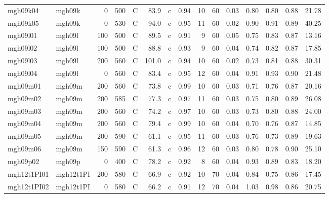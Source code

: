 \documentclass{article}
\begin{document}
\begin{landscape}
\begin{longtable}{llrrlrlrrrrrrrr}
    mgh09k04 &     mgh09k &    0 &  500 &     C &    83.9 &   c &  0.94 &  10 &         60 &  0.03 &  0.80 &  0.80 &  0.88 &   21.78 \\
    mgh09k05 &     mgh09k &    0 &  530 &     C &    94.0 &   c &  0.95 &  11 &         60 &  0.02 &  0.90 &  0.91 &  0.89 &   40.25 \\
    mgh09l01 &     mgh09l &  100 &  500 &     C &    89.5 &   c &  0.91 &   9 &         60 &  0.05 &  0.75 &  0.83 &  0.87 &   13.16 \\
    mgh09l02 &     mgh09l &  100 &  500 &     C &    88.8 &   c &  0.93 &   9 &         60 &  0.04 &  0.74 &  0.82 &  0.87 &   17.85 \\
    mgh09l03 &     mgh09l &  200 &  560 &     C &   101.0 &   c &  0.94 &  10 &         60 &  0.02 &  0.73 &  0.81 &  0.88 &   30.31 \\
    mgh09l04 &     mgh09l &    0 &  560 &     C &    83.4 &   c &  0.95 &  12 &         60 &  0.04 &  0.91 &  0.93 &  0.90 &   21.48 \\
    mgh09m01 &     mgh09m &  200 &  560 &     C &    73.8 &   c &  0.99 &  10 &         60 &  0.03 &  0.71 &  0.76 &  0.87 &   20.16 \\
    mgh09m02 &     mgh09m &  200 &  585 &     C &    77.3 &   c &  0.97 &  11 &         60 &  0.03 &  0.75 &  0.80 &  0.89 &   26.08 \\
    mgh09m03 &     mgh09m &  200 &  560 &     C &    74.2 &   c &  0.97 &  10 &         60 &  0.03 &  0.73 &  0.80 &  0.88 &   24.00 \\
    mgh09m04 &     mgh09m &  200 &  560 &     C &    79.4 &   c &  0.99 &  10 &         60 &  0.04 &  0.70 &  0.76 &  0.87 &   14.85 \\
    mgh09m05 &     mgh09m &  200 &  590 &     C &    61.1 &   c &  0.95 &  11 &         60 &  0.03 &  0.76 &  0.73 &  0.89 &   19.63 \\
    mgh09m06 &     mgh09m &  150 &  590 &     C &    61.3 &   c &  0.96 &  12 &         60 &  0.03 &  0.80 &  0.78 &  0.90 &   25.10 \\
    mgh09p02 &     mgh09p &    0 &  400 &     C &    78.2 &   c &  0.92 &   8 &         60 &  0.04 &  0.93 &  0.89 &  0.83 &   18.20 \\
 mgh12t1PI01 &  mgh12t1PI &  200 &  580 &     C &    66.9 &   c &  0.92 &  10 &         70 &  0.04 &  0.84 &  0.75 &  0.86 &   17.45 \\
 mgh12t1PI02 &  mgh12t1PI &    0 &  580 &     C &    66.2 &   c &  0.91 &  12 &         70 &  0.04 &  1.03 &  0.98 &  0.86 &   20.75 \\

\end{longtable}
\end{landscape}
\end{document}

